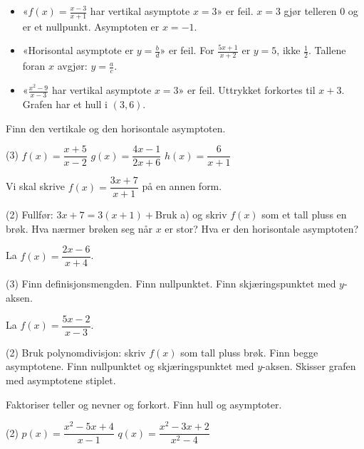 \begin{vanligfeil}
\begin{itemize}[leftmargin=1.2em,itemsep=1pt,topsep=0pt]
  \item «$f(x) = \frac{x-3}{x+1}$ har vertikal asymptote $x = 3$» er feil. $x = 3$ gjør telleren 0 og er et nullpunkt. Asymptoten er $x = -1$.
  \item «Horisontal asymptote er $y = \frac{b}{d}$» er feil. For $\frac{5x+1}{x+2}$ er $y = 5$, ikke $\frac{1}{2}$. Tallene foran $x$ avgjør: $y = \frac{a}{c}$.
  \item «$\frac{x^2-9}{x-3}$ har vertikal asymptote $x = 3$» er feil. Uttrykket forkortes til $x + 3$. Grafen har et hull i $(3, 6)$.
\end{itemize}
\end{vanligfeil}


Finn den vertikale og den horisontale asymptoten.
\begin{tasks}(3)
  \task $f(x) = \dfrac{x+5}{x-2}$
  \task $g(x) = \dfrac{4x-1}{2x+6}$
  \task $h(x) = \dfrac{6}{x+1}$
\end{tasks}

Vi skal skrive $f(x) = \dfrac{3x+7}{x+1}$ på en annen form.
\begin{tasks}(2)
  \task Fullfør: $3x + 7 = 3(x+1) + $\skrivlinje[1.5cm]
  \task Bruk a) og skriv $f(x)$ som et tall pluss en brøk.
  \task Hva nærmer brøken seg når $x$ er stor?
  \task Hva er den horisontale asymptoten?
\end{tasks}

La $f(x) = \dfrac{2x-6}{x+4}$.
\begin{tasks}(3)
  \task Finn definisjonsmengden.
  \task Finn nullpunktet.
  \task Finn skjæringspunktet med $y$-aksen.
\end{tasks}


La $f(x) = \dfrac{5x-2}{x-3}$.
\begin{tasks}(2)
  \task Bruk polynomdivisjon: skriv $f(x)$ som tall pluss brøk.
  \task Finn begge asymptotene.
  \task Finn nullpunktet og skjæringspunktet med $y$-aksen.
  \task Skisser grafen med asymptotene stiplet.
\end{tasks}

Faktoriser teller og nevner og forkort. Finn hull og asymptoter.
\begin{tasks}(2)
  \task $p(x) = \dfrac{x^2 - 5x + 4}{x - 1}$
  \task $q(x) = \dfrac{x^2 - 3x + 2}{x^2 - 4}$
\end{tasks}

